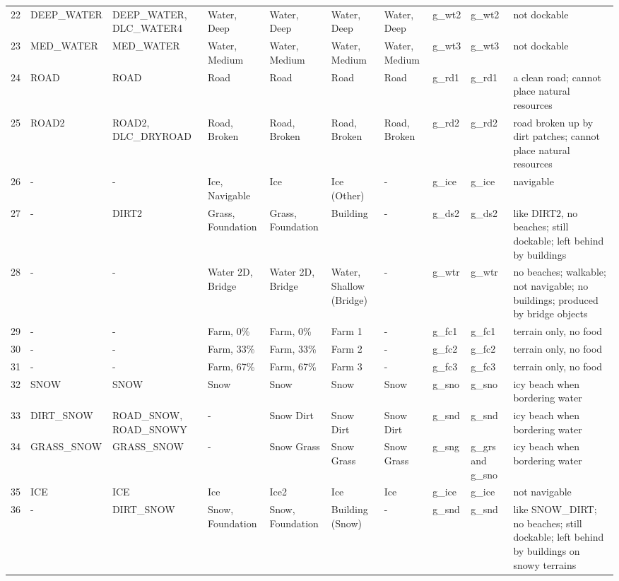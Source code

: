 \begin{appendices}
\begin{landscape}
\begin{longtable}{@{}p{5mm}|p{25mm}p{23mm}|p{14mm}p{14mm}p{14mm}p{14mm}|p{10mm}p{15mm}|p{45mm}@{}}
            22	& DEEP\_WATER	& DEEP\_WATER, DLC\_WATER4	& Water, Deep	& Water, Deep	& Water, Deep	& Water, Deep	& g\_wt2	& g\_wt2		& not dockable \\
            23	& MED\_WATER	& MED\_WATER	& Water, Medium	& Water, Medium	& Water, Medium	& Water, Medium	& g\_wt3	& g\_wt3		& not dockable \\
            24	& ROAD	& ROAD	& Road	& Road	& Road	& Road	& g\_rd1	& g\_rd1		& a clean road; cannot place natural resources \\
            25	& ROAD2	& ROAD2, DLC\_DRYROAD	& Road, Broken	& Road, Broken	& Road, Broken	& Road, Broken	& g\_rd2	& g\_rd2		& road broken up by dirt patches; cannot place natural resources \\
            26	& -	& -	& Ice, Navigable	& Ice	& Ice (Other)	& -	& g\_ice	& g\_ice		& navigable \\
            27	& -	& DIRT2	& Grass, Foundation	& Grass, Foundation	& Building	& -	& g\_ds2	& g\_ds2		& like DIRT2, no beaches; still dockable; left behind by buildings \\
            28	& -	& -	& Water 2D, Bridge	& Water 2D, Bridge	& Water, Shallow (Bridge)	& -	& g\_wtr	& g\_wtr		& no beaches; walkable; not navigable; no buildings; produced by bridge objects \\
            29	& -	& -	& Farm, 0\%	& Farm, 0\%	& Farm 1	& -	& g\_fc1	& g\_fc1		& terrain only, no food \\
            30	& -	& -	& Farm, 33\%	& Farm, 33\%	& Farm 2	& -	& g\_fc2	& g\_fc2		& terrain only, no food \\
            31	& -	& -	& Farm, 67\%	& Farm, 67\%	& Farm 3	& -	& g\_fc3	& g\_fc3		& terrain only, no food \\
            32	& SNOW	& SNOW	& Snow	& Snow	& Snow	& Snow	& g\_sno	& g\_sno		& icy beach when bordering water \\
            33	& DIRT\_SNOW	& ROAD\_SNOW, ROAD\_SNOWY	& -	& Snow Dirt	& Snow Dirt	& Snow Dirt	& g\_snd	& g\_snd		& icy beach when bordering water \\
            34	& GRASS\_SNOW	& GRASS\_SNOW	& -	& Snow Grass	& Snow Grass	& Snow Grass	& g\_sng	& g\_grs and g\_sno		& icy beach when bordering water \\
            35	& ICE	& ICE	& Ice	& Ice2	& Ice	& Ice	& g\_ice	& g\_ice		& not navigable \\
            36	& -	& DIRT\_SNOW	& Snow, Foundation	& Snow, Foundation	& Building (Snow)	& -	& g\_snd	& g\_snd		& like SNOW\_DIRT; no beaches; still dockable; left behind by buildings on snowy terrains \\

\end{longtable}
\end{landscape}
\end{appendices}
